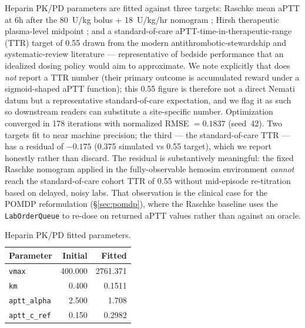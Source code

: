 \documentclass[11pt]{article}
\begin{document}
Heparin PK/PD parameters are fitted against three targets: Raschke mean aPTT at 6h after the 80~U/kg bolus + 18~U/kg/hr nomogram \citep{raschke1993}; Hirsh therapeutic plasma-level midpoint \citep{hirsh2001}; and a standard-of-care aPTT-time-in-therapeutic-range (TTR) target of 0.55 drawn from the modern antithrombotic-stewardship and systematic-review literature \citep{wan2008} --- representative of bedside performance that an idealized dosing policy would aim to approximate. We note explicitly that \citet{nemati2016} does \emph{not} report a TTR number (their primary outcome is accumulated reward under a sigmoid-shaped aPTT function); this 0.55 figure is therefore not a direct Nemati datum but a representative standard-of-care expectation, and we flag it as such so downstream readers can substitute a site-specific number. Optimization converged in 178 iterations with normalized RMSE $= 0.1837$ (seed~42). Two targets fit to near machine precision; the third --- the standard-of-care TTR --- has a residual of $-0.175$ (0.375 simulated vs 0.55 target), which we report honestly rather than discard. The residual is substantively meaningful: the fixed Raschke nomogram applied in the fully-observable hemosim environment \emph{cannot} reach the standard-of-care cohort TTR of 0.55 without mid-episode re-titration based on delayed, noisy labs. That observation is the clinical case for the POMDP reformulation (\S\ref{sec:pomdp}), where the Raschke baseline uses the \texttt{LabOrderQueue} to re-dose on returned aPTT values rather than against an oracle.

\begin{table}[ht]
\centering
\caption{Heparin PK/PD fitted parameters.}
\label{tab:heparin_fit}
\begin{tabular}{@{}lrr@{}}
\toprule
\textbf{Parameter} & \textbf{Initial} & \textbf{Fitted} \\
\midrule
\texttt{vmax}       & 400.000 & 2761.371 \\
\texttt{km}         & 0.400   & 0.1511 \\
\texttt{aptt\_alpha} & 2.500  & 1.708 \\
\texttt{aptt\_c\_ref} & 0.150 & 0.2982 \\
\bottomrule
\end{tabular}
\end{table}
\end{document}
